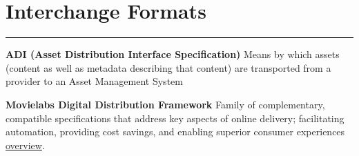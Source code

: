 \section{Interchange Formats}
\hrule

\medskip
\textbf{ADI (Asset Distribution Interface Specification)}
Means by which assets (content as well as metadata describing that content) are transported from a provider to an Asset Management System

\smallskip
\textbf{Movielabs Digital Distribution Framework}
Family of complementary, compatible specifications that address key aspects of online delivery; facilitating automation, providing cost savings, and enabling superior consumer experiences \href{https://movielabs.com/md/}{overview}.
